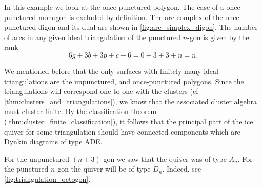 \begin{example}

	In this example we look at the once-punctured polygon. The case of a once-punctured
	monogon is excluded by definition. The arc complex of the once-punctured digon and its
	dual are shown in \cref{fig:arc_simplex_digon}. The number of arcs in any given ideal
	triangulation of the punctured $n$-gon is given by the rank
	\begin{equation*}
		6g + 3b + 3p + c -6 = 0 + 3 + 3 + n = n.
	\end{equation*}

	We mentioned before that the only surfaces with finitely many ideal triangulations are
	the unpunctured, and once-punctured polygons. Since the triangulations will correspond
	one-to-one with the clusters (cf \cref{thm:clusters_and_triangulations}), we know that
	the associated cluster algebra must cluster-finite. By the classification theorem
	(\cref{thm:cluster_finite_classification}), it follows that the principal part of the
	ice quiver for some triangulation should have connected components which are Dynkin
	diagrams of type ADE.

	For the unpunctured $(n+3)$-gon we saw that the quiver was of type $A_n$. For the
	punctured $n$-gon the quiver will be of type $D_n$. Indeed, see
	\cref{fig:triangulation_octogon}.

	\begin{figure}[ht!]
		\centering

\end{figure}
\end{example}
